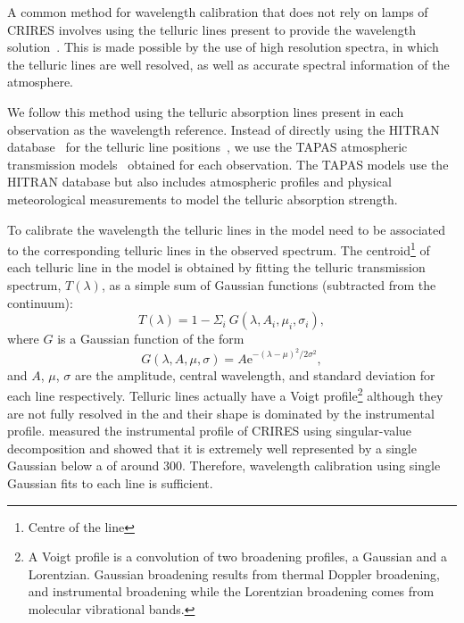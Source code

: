 A common method for wavelength calibration that does not rely on \thar{} lamps of {CRIRES} involves using the telluric lines present to provide the wavelength solution~\citep[e.g.][]{brogi_signature_2012,brogi_carbon_2014,dekok_detection_2013,piskorz_evidence_2016}.
This is made possible by the use of high resolution spectra, in which the telluric lines are well resolved, as well as accurate spectral information of the atmosphere.

We follow this method using the telluric absorption lines present in each observation as the wavelength reference.
Instead of directly using the {HITRAN} database~\citep{rothman_hitran2012_2013} for the telluric line positions~\citet[such as in][]{brogi_signature_2012,brogi_carbon_2014,dekok_detection_2013}, we use the {TAPAS} atmospheric transmission models~\citep{bertaux_tapas_2014} obtained for each observation.
The {TAPAS} models use the {HITRAN} database but also includes atmospheric profiles and physical meteorological measurements to model the telluric absorption strength.

To calibrate the wavelength the telluric lines in the model need to be associated to the corresponding telluric lines in the observed spectrum.
The centroid\footnote{Centre of the line} of each telluric line in the model is obtained by fitting the telluric transmission spectrum, \(T(\lambda)\), as a simple sum of Gaussian functions (subtracted from the continuum):
\begin{equation}
T(\lambda) = 1 - {\Sigma}_{i}\ G(\lambda, A_{i}, {\mu}_{i}, {\sigma}_{i}),
\end{equation}
where \(G\) is a Gaussian function of the form
\begin{equation}
G(\lambda, A, \mu, \sigma) = {A \textrm{e}}^{{-(\lambda-\mu)}^{2}/2\sigma^{2}},
\end{equation}
and \(A\), \(\mu\), \(\sigma\) are the amplitude, central wavelength, and standard deviation for each line respectively.
Telluric lines actually have a Voigt profile\footnote{A Voigt profile is a convolution of two broadening profiles, a Gaussian and a Lorentzian.
Gaussian broadening results from thermal Doppler broadening, and instrumental broadening while the Lorentzian broadening comes from molecular vibrational bands\citep{meier_art_2005}.} although they are not fully resolved in the \nir{} and their shape is dominated by the instrumental profile. \citet{seifahrt_synthesising_2010} measured the instrumental profile of {CRIRES} using singular-value decomposition and showed that it is extremely well represented by a single Gaussian below a \snr{} of around 300.
Therefore, wavelength calibration using single Gaussian fits to each line is sufficient.

